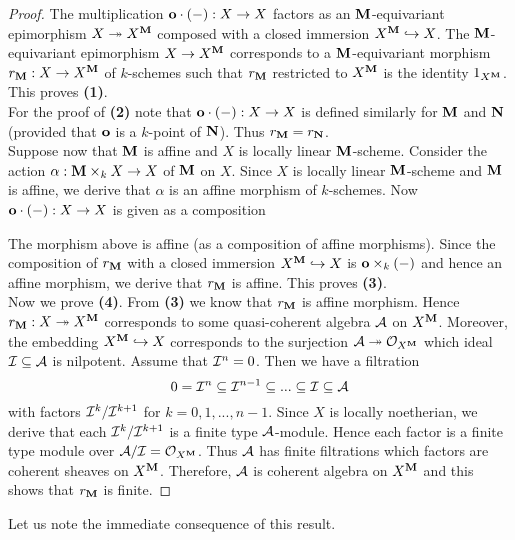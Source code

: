 \begin{proof}
The multiplication $\mathbf{o}\cdot (-):X\rightarrow X$ factors as an $\mathbf{M}$-equivariant epimorphism $X \twoheadrightarrow X^{\mathbf{M}}$ composed with a closed immersion $X^{\mathbf{M}} \hookrightarrow X$. The $\mathbf{M}$-equivariant epimorphism $X\rightarrow X^{\mathbf{M}}$ corresponds to a $\mathbf{M}$-equivariant morphism $r_{\mathbf{M}}:X\rightarrow X^{\mathbf{M}}$ of $k$-schemes such that $r_{\mathbf{M}}$ restricted to $X^{\mathbf{M}}$ is the identity $1_{X^{\mathbf{M}}}$. This proves \textbf{(1)}.\\
For the proof of \textbf{(2)} note that $\mathbf{o}\cdot (-):X\rightarrow X$ is defined similarly for $\mathbf{M}$ and $\mathbf{N}$ (provided that $\mathbf{o}$ is a $k$-point of $\mathbf{N}$). Thus $r_{\mathbf{M}} = r_{\mathbf{N}}$.\\
Suppose now that $\mathbf{M}$ is affine and $X$ is locally linear $\mathbf{M}$-scheme. Consider the action $\alpha:\mathbf{M}\times_k X\rightarrow X$ of $\mathbf{M}$ on $X$. Since $X$ is locally linear $\mathbf{M}$-scheme and $\mathbf{M}$ is affine, we derive that $\alpha$ is an affine morphism of $k$-schemes. Now $\mathbf{o}\cdot (-):X\rightarrow X$ is given as a composition 
\begin{center}
\end{center}
The morphism above is affine (as a composition of affine morphisms). Since the composition of $r_{\mathbf{M}}$ with a closed immersion $X^{\mathbf{M}}\hookrightarrow X$ is $\mathbf{o}\times_k(-)$ and hence an affine morphism, we derive that $r_{\mathbf{M}}$ is affine. This proves \textbf{(3)}.\\
Now we prove \textbf{(4)}. From \textbf{(3)} we know that $r_{\mathbf{M}}$ is affine morphism. Hence $r_{\mathbf{M}}:X\twoheadrightarrow X^{\mathbf{M}}$ corresponds to some quasi-coherent algebra ${\mathcal A}$ on $X^{\mathbf{M}}$. Moreover, the embedding $X^{\mathbf{M}}\hookrightarrow X$ corresponds to the surjection ${\mathcal A}\twoheadrightarrow {\mathcal O}_{X^{\mathbf{M}}}$ which ideal ${\mathcal I}\subseteq {\mathcal A}$ is nilpotent. Assume that ${\mathcal I}^n = 0$. Then we have a filtration
$$0 = {\mathcal I}^n \subseteq {\mathcal I}^{n-1} \subseteq ... \subseteq {\mathcal I}\subseteq {\mathcal A}$$
with factors ${\mathcal I}^k/{\mathcal I}^{k+1}$ for $k=0,1,...,n-1$. Since $X$ is locally noetherian, we derive that each ${\mathcal I}^k/{\mathcal I}^{k+1}$ is a finite type ${\mathcal A}$-module. Hence each factor is a finite type module over ${\mathcal A}/{\mathcal I} = {\mathcal O}_{X^{\mathbf{M}}}$. Thus ${\mathcal A}$ has finite filtrations which factors are coherent sheaves on $X^{\mathbf{M}}$. Therefore, ${\mathcal A}$ is coherent algebra on $X^{\mathbf{M}}$ and this shows that $r_{\mathbf{M}}$ is finite.
\end{proof}
\noindent
Let us note the immediate consequence of this result.


